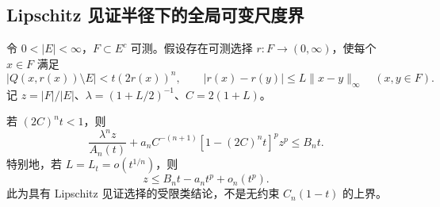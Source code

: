 \subsection{Lipschitz 见证半径下的全局可变尺度界}
\label{model:lipschitz}
令 $0<|E|<\infty$，$F\subset E^c$ 可测。假设存在可测选择 $r:F\to(0,\infty)$，使每个 $x\in F$ 满足
\begin{equation}\label{eq:lipschitz-witness}
|Q(x,r(x))\setminus E|<t(2r(x))^n, \qquad |r(x)-r(y)|\le L\|x-y\|_\infty\quad(x,y\in F).
\end{equation}
记 $z=|F|/|E|$、$\lambda=(1+L/2)^{-1}$、$C=2(1+L)$。
\begin{theorem}
若 $(2C)^nt<1$，则
\begin{equation}\label{eq:lipschitz-bound}
\frac{\lambda^n z}{A_n(t)}+ a_nC^{-(n+1)}[1-(2C)^nt]^p z^p\le B_n t.
\end{equation}
特别地，若 $L=L_t=o(t^{1/n})$，则
\begin{equation}\label{eq:lipschitz-endpoint}
z\le B_n t-a_nt^p+o_n(t^p).
\end{equation}
此为具有 Lipschitz 见证选择的受限类结论，不是无约束 $C_n(1-t)$ 的上界。
\end{theorem}
